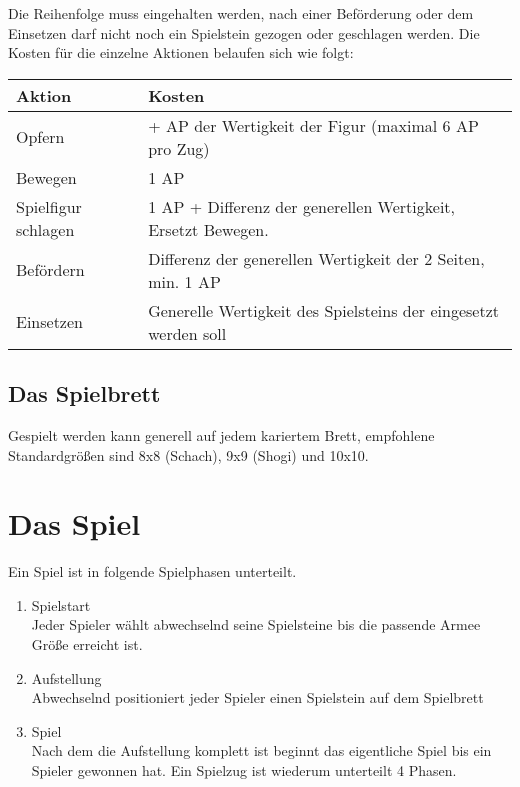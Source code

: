 \documentclass{article}
\begin{document}
	Die Reihenfolge muss eingehalten werden, nach einer Beförderung oder dem Einsetzen darf nicht noch ein 
	Spielstein gezogen oder geschlagen werden.
	Die Kosten für die einzelne Aktionen belaufen sich wie folgt:
	
	\begin{tabular}{ll}
	\hline
	Aktion & Kosten \\ \hline
	Opfern & + AP der Wertigkeit der Figur (maximal 6 AP pro Zug) \\
	Bewegen &  1 AP \\
	Spielfigur schlagen & 1 AP + Differenz der generellen Wertigkeit, Ersetzt Bewegen. \\
	Befördern & Differenz der generellen Wertigkeit der 2 Seiten, min. 1 AP \\
	Einsetzen 	 
	& Generelle Wertigkeit des Spielsteins der eingesetzt werden soll \\ \hline
	\end{tabular} 
	
	

\subsection{Das Spielbrett}
	Gespielt werden kann generell auf jedem kariertem Brett, empfohlene Standardgrößen sind
	8x8 (Schach), 9x9 (Shogi) und 10x10.
	

\section{Das Spiel}

	Ein Spiel ist in folgende Spielphasen unterteilt.

	\begin{enumerate}
	\item Spielstart \\
	 	  Jeder Spieler wählt abwechselnd seine Spielsteine bis die passende Armee Größe erreicht ist.
	\item Aufstellung \\
	  	  Abwechselnd positioniert jeder Spieler einen Spielstein auf dem Spielbrett
	\item Spiel \\
	  	  Nach dem die Aufstellung komplett ist beginnt das eigentliche Spiel bis ein Spieler gewonnen hat.
	  	  Ein Spielzug ist wiederum unterteilt 4 Phasen.
	\end{enumerate}
\end{document}
